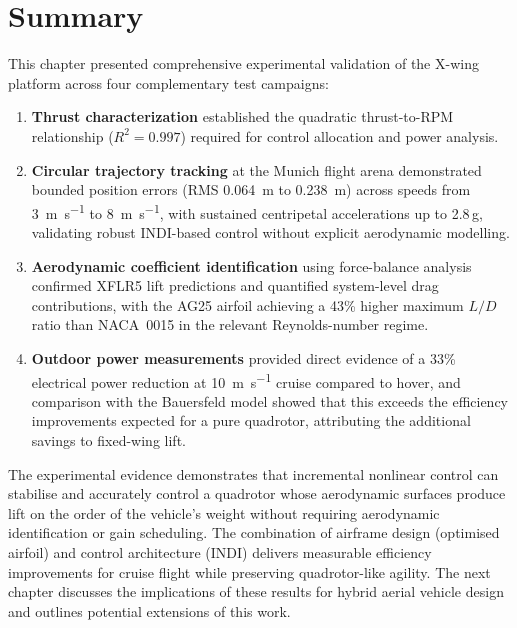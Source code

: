 \section{Summary}\label{sec:exp-summary}

This chapter presented comprehensive experimental validation of the X-wing platform across four complementary test campaigns:

\begin{enumerate}
  \item \textbf{Thrust characterization} established the quadratic thrust-to-RPM relationship ($R^2 = 0.997$) required for control allocation and power analysis.
  
  \item \textbf{Circular trajectory tracking} at the Munich flight arena demonstrated bounded position errors (RMS \SI{0.064}{\meter} to \SI{0.238}{\meter}) across speeds from \SI{3}{\meter\per\second} to \SI{8}{\meter\per\second}, with sustained centripetal accelerations up to 2.8\,g, validating robust INDI-based control without explicit aerodynamic modelling.
  
  \item \textbf{Aerodynamic coefficient identification} using force-balance analysis confirmed XFLR5 lift predictions and quantified system-level drag contributions, with the AG25 airfoil achieving a 43\% higher maximum $L/D$ ratio than NACA~0015 in the relevant Reynolds-number regime.
  
  \item \textbf{Outdoor power measurements} provided direct evidence of a 33\% electrical power reduction at \SI{10}{\meter\per\second} cruise compared to hover, and comparison with the Bauersfeld model showed that this exceeds the efficiency improvements expected for a pure quadrotor, attributing the additional savings to fixed-wing lift.
\end{enumerate}

The experimental evidence demonstrates that incremental nonlinear control can stabilise and accurately control a quadrotor whose aerodynamic surfaces produce lift on the order of the vehicle's weight without requiring aerodynamic identification or gain scheduling.
The combination of airframe design (optimised airfoil) and control architecture (INDI) delivers measurable efficiency improvements for cruise flight while preserving quadrotor-like agility.
The next chapter discusses the implications of these results for hybrid aerial vehicle design and outlines potential extensions of this work.
